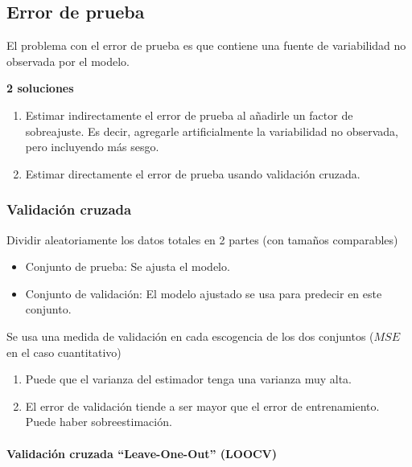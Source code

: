 \documentclass[
  12pt,
]{book}
\providecommand{\tightlist}{%
  \setlength{\itemsep}{0pt}\setlength{\parskip}{0pt}}
\theoremstyle{definition}
\theoremstyle{definition}
\theoremstyle{definition}
\theoremstyle{remark}
\begin{document}
\hypertarget{error-de-prueba}{%
\subsection{Error de prueba}\label{error-de-prueba}}

El problema con el error de prueba es que contiene una fuente de variabilidad no observada por el modelo.

\textbf{2 soluciones}

\begin{enumerate}
\def\labelenumi{\alph{enumi}.}
\tightlist
\item
  Estimar indirectamente el error de prueba al añadirle un factor de sobreajuste. Es decir, agregarle artificialmente la variabilidad no observada, pero incluyendo más sesgo.
\item
  Estimar directamente el error de prueba usando validación cruzada.
\end{enumerate}

\hypertarget{validaciuxf3n-cruzada-2}{%
\subsubsection{Validación cruzada}\label{validaciuxf3n-cruzada-2}}

Dividir aleatoriamente los datos totales en 2 partes (con tamaños comparables)

\begin{itemize}
\tightlist
\item
  Conjunto de prueba: Se ajusta el modelo.
\item
  Conjunto de validación: El modelo ajustado se usa para predecir en este conjunto.
\end{itemize}

Se usa una medida de validación en cada escogencia de los dos conjuntos (\(MSE\) en el caso cuantitativo)

\begin{enumerate}
\def\labelenumi{\arabic{enumi}.}
\tightlist
\item
  Puede que el varianza del estimador tenga una varianza muy alta.
\item
  El error de validación tiende a ser mayor que el error de entrenamiento. Puede haber sobreestimación.
\end{enumerate}

\hypertarget{validaciuxf3n-cruzada-leave-one-out-loocv}{%
\paragraph{Validación cruzada ``Leave-One-Out'' (LOOCV)}\label{validaciuxf3n-cruzada-leave-one-out-loocv}}
\end{document}

